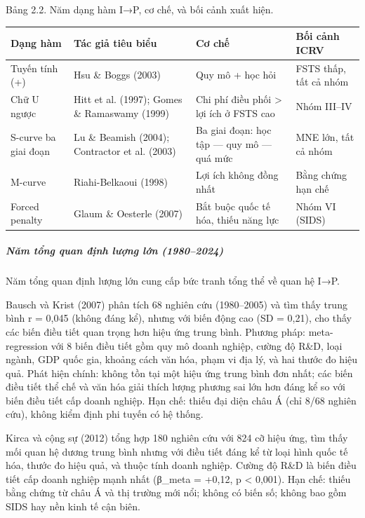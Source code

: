 \documentclass[12pt,a4paper]{article}
\begin{document}
Bảng 2.2. Năm dạng hàm I→P, cơ chế, và bối cảnh xuất hiện.

\begin{longtable}[]{@{}llll@{}}
\toprule\noalign{}
Dạng hàm & Tác giả tiêu biểu & Cơ chế & Bối cảnh ICRV \\
\midrule\noalign{}
\endhead
\bottomrule\noalign{}
\endlastfoot
Tuyến tính (+) & Hsu \& Boggs (2003) & Quy mô + học hỏi & FSTS thấp, tất
cả nhóm \\
Chữ U ngược & Hitt et al. (1997); Gomes \& Ramaswamy (1999) & Chi phí
điều phối \textgreater{} lợi ích ở FSTS cao & Nhóm III--IV \\
S-curve ba giai đoạn & Lu \& Beamish (2004); Contractor et al. (2003) &
Ba giai đoạn: học tập --- quy mô --- quá mức & MNE lớn, tất cả nhóm \\
M-curve & Riahi-Belkaoui (1998) & Lợi ích không đồng nhất & Bằng chứng
hạn chế \\
Forced penalty & Glaum \& Oesterle (2007) & Bắt buộc quốc tế hóa, thiếu
năng lực & Nhóm VI (SIDS) \\
\end{longtable}

\hypertarget{nux103m-tux1ed5ng-quan-ux111ux1ecbnh-lux1b0ux1ee3ng-lux1edbn-19802024}{%
\subparagraph{Năm tổng quan định lượng lớn
(1980--2024)}\label{nux103m-tux1ed5ng-quan-ux111ux1ecbnh-lux1b0ux1ee3ng-lux1edbn-19802024}}

Năm tổng quan định lượng lớn cung cấp bức tranh tổng thể về quan hệ I→P.

Bausch và Krist (2007) phân tích 68 nghiên cứu (1980--2005) và tìm thấy
trung bình r = 0,045 (không đáng kể), nhưng với biến động cao (SD =
0,21), cho thấy các biến điều tiết quan trọng hơn hiệu ứng trung bình.
Phương pháp: meta-regression với 8 biến điều tiết gồm quy mô doanh
nghiệp, cường độ R\&D, loại ngành, GDP quốc gia, khoảng cách văn hóa,
phạm vi địa lý, và hai thước đo hiệu quả. Phát hiện chính: không tồn tại
một hiệu ứng trung bình đơn nhất; các biến điều tiết thể chế và văn hóa
giải thích lượng phương sai lớn hơn đáng kể so với biến điều tiết cấp
doanh nghiệp. Hạn chế: thiếu đại diện châu Á (chỉ 8/68 nghiên cứu),
không kiểm định phi tuyến có hệ thống.

Kirca và cộng sự (2012) tổng hợp 180 nghiên cứu với 824 cỡ hiệu ứng, tìm
thấy mối quan hệ dương trung bình nhưng với điều tiết đáng kể từ loại
hình quốc tế hóa, thước đo hiệu quả, và thuộc tính doanh nghiệp. Cường
độ R\&D là biến điều tiết cấp doanh nghiệp mạnh nhất (β\_meta = +0,12, p
\textless{} 0,001). Hạn chế: thiếu bằng chứng từ châu Á và thị trường
mới nổi; không có biến số; không bao gồm SIDS hay nền kinh tế cận biên.
\end{document}
